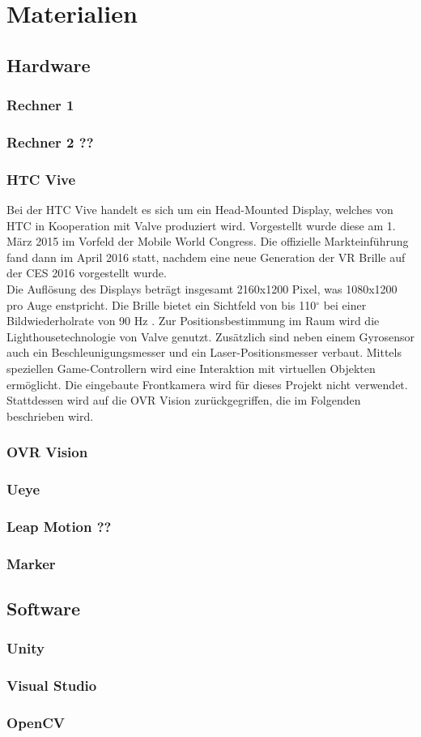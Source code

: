 \section{Materialien}
\subsection{Hardware}
\subsubsection{Rechner 1}
\subsubsection{Rechner 2 ??}
\subsubsection{HTC Vive}
Bei der HTC Vive handelt es sich um ein Head-Mounted Display, welches von HTC in Kooperation mit Valve produziert wird. Vorgestellt wurde diese am 1. März 2015 im Vorfeld der Mobile World Congress. Die offizielle Markteinführung fand dann im April 2016 statt, nachdem eine neue Generation der VR Brille auf der CES 2016 vorgestellt wurde. \\
Die Auflösung des Displays beträgt insgesamt 2160x1200 Pixel, was 1080x1200 pro Auge enstpricht. Die Brille bietet ein Sichtfeld von bis 110$^\circ$ bei einer Bildwiederholrate von 90 Hz \cite{website:HTC_Vive}. Zur Positionsbestimmung im Raum wird die  Lighthousetechnologie von Valve genutzt. Zusätzlich sind neben einem Gyrosensor auch ein Beschleunigungsmesser   und ein Laser-Positionsmesser verbaut. Mittels speziellen Game-Controllern wird eine Interaktion mit virtuellen    Objekten ermöglicht. Die eingebaute Frontkamera wird für dieses Projekt nicht verwendet. Stattdessen wird auf die OVR Vision zurückgegriffen, die im Folgenden beschrieben wird.


    

\subsubsection{OVR Vision}
\subsubsection{Ueye}
\subsubsection{Leap Motion ??}
\subsubsection{Marker}
\subsection{Software}
\subsubsection{Unity}
\subsubsection{Visual Studio}
\subsubsection{OpenCV}


\newpage